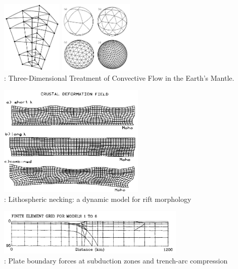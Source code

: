 \begin{center}
\begin{minipage}{0.48\textwidth}
\centering
\includegraphics[height=3.5cm]{images/history/baum85a}
\includegraphics[height=3.5cm]{images/history/baum85b}\\
{: Three-Dimensional Treatment of Convective Flow in the Earth's Mantle.
\cite{baum85}}
\end{minipage}\hfill
\begin{minipage}{0.45\textwidth}
\centering
\includegraphics[width=7cm]{images/history/zupf86}\\
{: Lithospheric necking: a dynamic model for rift morphology \cite{zupf86}}
\end{minipage}
\end{center}


\begin{center}
\includegraphics[width=9cm]{images/history/boww89}\\
{: Plate boundary forces at subduction zones and trench-arc compression \cite{boww89}}
\end{center}

